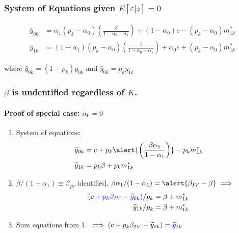 \documentclass{beamer}
\begin{document}
\begin{frame}
  \frametitle{System of Equations given $E[\varepsilon|z]=0$}
  \alert{}
\begin{align*}
  \hat{y}_{0k} &=\alpha_1(p_k - \alpha_0)\left(\frac{\beta}{1 - \alpha_0 - \alpha_1}\right) + (1-\alpha_0)c - (p _k -  \alpha_0)m_{1k}^* \\[1.5ex]
  \label{eq:MC1IV}
  \hat{y}_{1k} &=(1-\alpha_1)(p_k - \alpha_0)\left(\frac{\beta}{1 - \alpha_0 - \alpha_1}\right) + \alpha_0 c + (p _k -  \alpha_0)m_{1k}^*
\end{align*}

\vspace{0.5em}
where $\hat{y}_{0k}=(1-p_k)\bar{y}_{0k}$ and $\hat{y}_{0k}=p_k\bar{y}_{1k}$


\vspace{2em} 

\hfill \alert{}
\end{frame}
\begin{frame}
  \frametitle{$\beta$ is undentified regardless of $K$.}
  \framesubtitle{Proof of special case: $\alpha_0 = 0$}
    \begin{enumerate}
      \item System of equations: 
        \vspace{-0.5em}
\begin{align*}
  \widetilde{y}_{0k} &=c + p_k \alert{ \left(\frac{\beta\alpha_1}{1 -  \alpha_1}\right)} - p _k m_{1k}^* \\
  \widetilde{y}_{1k} &=p_k \beta + p _k m_{1k}^*
\end{align*}
  \item $\beta/(1-\alpha_1) \equiv \beta_{IV}$ identified,  $\beta\alpha_1/(1-\alpha_1) = \alert{\beta_{IV} - \beta} \implies$ 
        \vspace{-0.5em}
\begin{align*}
  \textcolor{blue}{(c + p_k \beta_{IV} - \widetilde{y}_{0k})}/p_k &=\beta + m_{1k}^* \\
  \widetilde{y}_{1k}/p_k &= \beta + m_{1k}^*
\end{align*}
\item Sum equations from 1.\ $\implies (c + p_k \beta_{IV} - \widetilde{y}_{0k}) = \textcolor{blue}{\widetilde{y}_{1k}}$
    \end{enumerate}
    
\end{frame}
\end{document}
